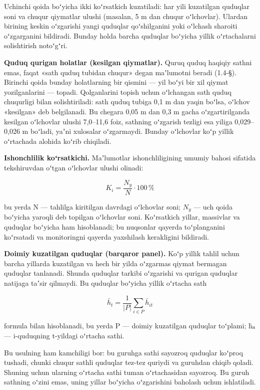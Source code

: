 Uchinchi qoida boʻyicha ikki koʻrsatkich kuzatiladi: har yili kuzatilgan
quduqlar soni va chuqur qiymatlar ulushi (masalan, 5 m dan chuqur
oʻlchovlar). Ulardan birining keskin oʻzgarishi yangi quduqlar
qoʻshilganini yoki oʻlchash sharoiti oʻzgarganini bildiradi. Bunday
holda barcha quduqlar boʻyicha yillik oʻrtachalarni solishtirish
notoʻgʻri.

\textbf{Quduq qurigan holatlar (kesilgan qiymatlar).} Quruq quduq
haqiqiy sathni emas, faqat «sath quduq tubidan chuqur» degan maʼlumotni
beradi (1.4-§). Birinchi qoida bunday holatlarning bir qismini --- yil
boʻyi bir xil qiymat yozilganlarini --- topadi. Qolganlarini topish
uchun oʻlchangan sath quduq chuqurligi bilan solishtiriladi: sath quduq
tubiga 0,1 m dan yaqin boʻlsa, oʻlchov «kesilgan» deb belgilanadi. Bu
chegara 0,05 m dan 0,3 m gacha oʻzgartirilganda kesilgan oʻlchovlar
ulushi 7,0--11,6 foiz, sathning oʻzgarish tezligi esa yiliga
0,029--0,026 m boʻladi, yaʼni xulosalar oʻzgarmaydi. Bunday oʻlchovlar
koʻp yillik oʻrtachada alohida koʻrib chiqiladi.

\textbf{Ishonchlilik koʻrsatkichi.} Maʼlumotlar ishonchliligining umumiy
bahosi sifatida tekshiruvdan oʻtgan oʻlchovlar ulushi olinadi:

\begin{equation}\tag{2.4}
K_i = \frac{N_y}{N} \cdot 100\,\%
\end{equation}

bu yerda N --- tahlilga kiritilgan davrdagi oʻlchovlar soni; \(N_{y}\)
--- uch qoida boʻyicha yaroqli deb topilgan oʻlchovlar soni. Koʻrsatkich
yillar, massivlar va quduqlar boʻyicha ham hisoblanadi; bu nuqsonlar
qayerda toʻplanganini koʻrsatadi va monitoringni qayerda yaxshilash
kerakligini bildiradi.

\textbf{Doimiy kuzatilgan quduqlar (barqaror panel).} Koʻp yillik tahlil
uchun barcha yillarda kuzatilgan va hech bir yilda oʻzgarmas qiymat
bermagan quduqlar tanlanadi. Shunda quduqlar tarkibi oʻzgarishi va
qurigan quduqlar natijaga taʼsir qilmaydi. Bu quduqlar boʻyicha yillik
oʻrtacha sath

\begin{equation}\tag{2.5}
\bar{h}_t = \frac{1}{|P|} \sum_{i \in P} \bar{h}_{it}
\end{equation}

formula bilan hisoblanadi, bu yerda P --- doimiy kuzatilgan quduqlar
toʻplami; h̄ᵢₜ --- i-quduqning t-yildagi oʻrtacha sathi.

Bu usulning ham kamchiligi bor: bu guruhga sathi sayozroq quduqlar
koʻproq tushadi, chunki chuqur sathli quduqlar tez-tez quriydi va
guruhdan chiqib qoladi. Shuning uchun ularning oʻrtacha sathi tuman
oʻrtachasidan sayozroq. Bu guruh sathning oʻzini emas, uning yillar
boʻyicha oʻzgarishini baholash uchun ishlatiladi.

